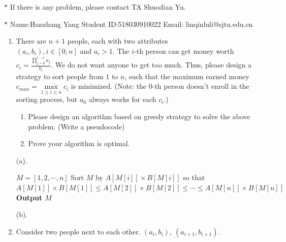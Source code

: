 \documentclass[12pt,a4paper]{article}
\makeatletter
\newtheorem*{solution}{Solution}
\theoremstyle{definition}
\renewenvironment{solution}[1][Solution] {\par\pushQED{\qed}\normalfont\topsep6\p@\@plus6\p@\relax\trivlist\item[\hskip\labelsep\bfseries#1\@addpunct{.}]\ignorespaces}{\popQED\endtrivlist\@endpefalse} \makeatother
\makeatother
\begin{document}
\noindent

\noindent{}
\begin{center}
\footnotesize{\color{red}$*$ If there is any problem, please contact TA Shuodian Yu.}

\footnotesize{\color{blue}$*$ Name:Hanzhang Yang  \quad Student ID:518030910022 \quad Email: linqinluli@sjtu.edu.cn}
\end{center}

\begin{enumerate}
    \item
    There are $n+1$ people, each with two attributes $(a_i,b_i), i\in[0,n] \text{ and } a_i>1$. The $i$-th person can get money worth $c_i = \frac{\prod_{j=0}^{i-1}{a_j}}{b_i}$. We do not want anyone to get too much. Thus, please design a strategy to sort people from $1$ to $n$, such that the maximum earned money $c_{max}=\max\limits_{1\leq i\leq n} c_i$ is minimized. (Note: the 0-th person doesn't enroll in the sorting process, but $a_0$ always works for each $c_i$.)
    \begin{enumerate}
        \item Please design an algorithm based on greedy strategy to solve the above problem. (Write a pseudocode)
        \item Prove your algorithm is optimal.
    \end{enumerate}

    (a).

    \begin{algorithm}[H]
        \BlankLine
        $M=[1,2,\cdots,n]$\;
        Sort $M$ by $A[M[i]]\times B[M[i]]$ so that $A[M[1]]\times B[M[1]] \le A[M[2]]\times B[M[2]] \le \cdots \le A[M[n]]\times B[M[n]]$\;
        \textbf{Output} $M$\;
    \end{algorithm}
        
   (b).

    \begin{solution}
        Consider two people next to each other. $(a_i,b_i),\ (a_{i+1},b_{i+1})$.


\end{solution}
\end{enumerate}
\end{document}
